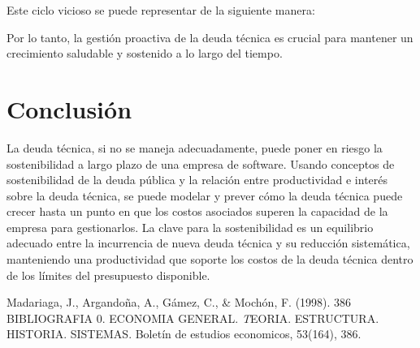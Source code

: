 \documentclass[12pt]{article}
\begin{document}
Este ciclo vicioso se puede representar de la siguiente manera:

\begin{center}
\end{center}

Por lo tanto, la gestión proactiva de la deuda técnica es crucial para mantener un crecimiento saludable y sostenido a lo largo del tiempo.


\section{Conclusión}

La deuda técnica, si no se maneja adecuadamente, puede poner en riesgo la sostenibilidad a largo plazo de una empresa de software. 
Usando conceptos de sostenibilidad de la deuda pública y la relación entre productividad e interés sobre la deuda técnica, se puede modelar y prever 
cómo la deuda técnica puede crecer hasta un punto en que los costos asociados superen la capacidad de la empresa para gestionarlos. 
La clave para la sostenibilidad es un equilibrio adecuado entre la incurrencia de nueva deuda técnica y su reducción sistemática, manteniendo una productividad 
que soporte los costos de la deuda técnica dentro de los límites del presupuesto disponible.


\begin{thebibliography}{100}
     Madariaga, J., Argandoña, A., Gámez, C., \& Mochón, F. (1998). 386 BIBLIOGRAFIA 0. ECONOMIA GENERAL. 
    \textit TEORIA. ESTRUCTURA. HISTORIA. SISTEMAS. Boletín de estudios economicos, 53(164), 386.
\end{thebibliography}
\end{document}
